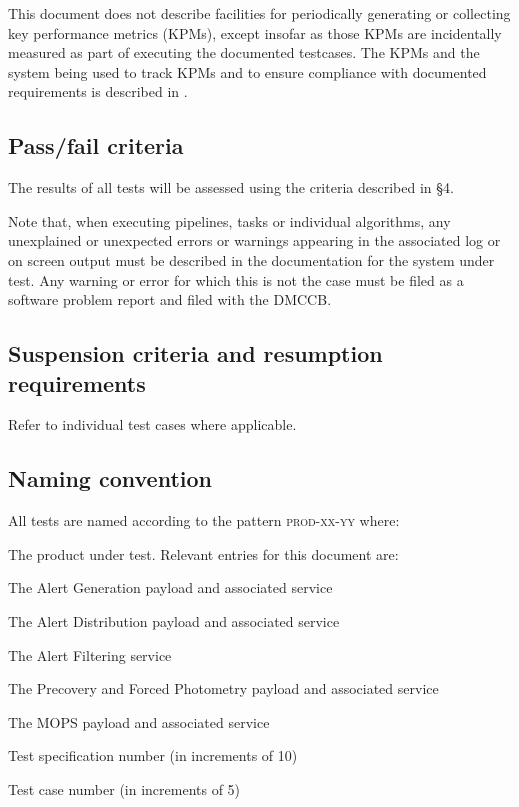 \documentclass[DM,STS,toc]{lsstdoc}
\begin{document}
This document does not describe facilities for periodically generating or
collecting key performance metrics (KPMs), except insofar as those KPMs are
incidentally measured as part of executing the documented testcases. The KPMs
and the system being used to track KPMs and to ensure compliance with
documented requirements is described in .

\subsection{Pass/fail criteria}
\label{sec:passfail}

The results of all tests will be assessed using the criteria described in
 \S4.

Note that, when executing pipelines, tasks or individual algorithms, any
unexplained or unexpected errors or warnings appearing in the associated log
or on screen output must be described in the documentation for the system
under test. Any warning or error for which this is not the case must be filed
as a software problem report and filed with the DMCCB.

\subsection{Suspension criteria and resumption requirements}
\label{suspension}

Refer to individual test cases where applicable.

\subsection{Naming convention}

All tests are named according to the pattern \textsc{prod-xx-yy} where:

\begin{description}[font=\normalfont\scshape]

  \item[prod]{The product under test. Relevant entries for this document are:
    \begin{description}[font=\normalfont\scshape,topsep=-1.0ex]
      \item[AG]{The Alert Generation payload and associated service}
      \item[AD]{The Alert Distribution payload and associated service}
      \item[AF]{The Alert Filtering service}
      \item[PFP]{The Precovery and Forced Photometry payload and associated
	      service}
      \item[MOPS]{The MOPS payload and associated service}
    \end{description}
  }
  \item[xx]{Test specification number (in increments of 10)}
  \item[yy]{Test case number (in increments of 5)}

\end{description}
\end{document}
